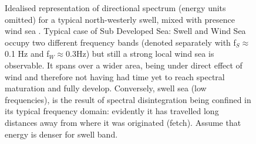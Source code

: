 \documentclass{article}
\begin{document}
\begin{figure}[t]
    
    \caption[Idealised directional spectrum]{Idealised representation of directional spectrum (energy units omitted) for a typical north-westerly swell, mixed with presence wind sea . Typical case of Sub Developed Sea: Swell and Wind Sea occupy two different frequency bands (denoted separately with f$_{S}$$\approx$0.1 Hz and f$_W$$\approx$0.3Hz) but still a strong local wind sea is observable. It spans over a wider area, being under direct effect of wind and therefore not having had time yet to reach spectral maturation and fully develop. Conversely, swell sea (low frequencies), is the result of spectral disintegration being confined in its typical frequency domain: evidently it has travelled long distances away from where it was originated (fetch). Assume that energy is denser for swell band.}
    \label{fig:sp2d}
\end{figure}
\end{document}
